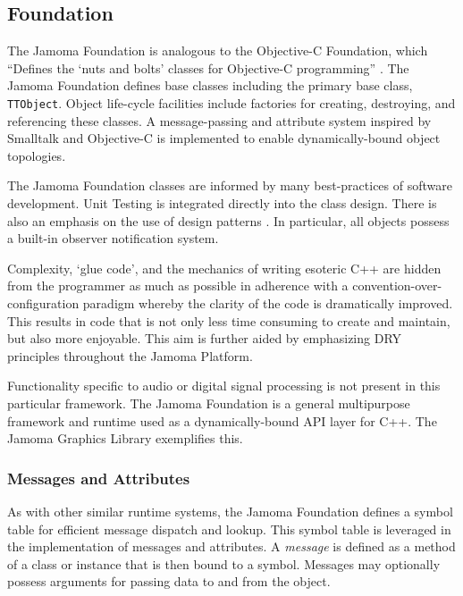 \documentclass[twoside,10pt]{article}
\begin{document}
\subsection{Foundation} %

The Jamoma Foundation \cite{web7} is analogous to the Objective-C Foundation, which ``Defines the `nuts and bolts' classes for Objective-C programming'' \cite{web8}.  The Jamoma Foundation defines base classes including the primary base class, \texttt{\small{TTObject}}.  Object life-cycle facilities include factories for creating, destroying, and referencing these classes.  A message-passing and attribute system inspired by Smalltalk and Objective-C is implemented to enable dynamically-bound object topologies.  

The Jamoma Foundation classes are informed by many best-practices of software development.  Unit Testing is integrated directly into the class design.  There is also an emphasis on the use of design patterns \cite{Gamma:1995}.  In particular, all objects possess a built-in observer notification system.  

Complexity, `glue code', and the mechanics of writing esoteric C++ are hidden from the programmer as much as possible in adherence with a convention-over-configuration paradigm whereby the clarity of the code is dramatically improved.  This results in code that is not only less time consuming to create and maintain, but also more enjoyable.  This aim is further aided by emphasizing DRY principles throughout the Jamoma Platform.

Functionality specific to audio or digital signal processing is not present in this particular framework.  The Jamoma Foundation is a general multipurpose framework and runtime used as a dynamically-bound API layer for C++.  The Jamoma Graphics Library exemplifies this.

\subsubsection{Messages and Attributes} %

As with other similar runtime systems, the Jamoma Foundation defines a symbol table for efficient message dispatch and lookup.  This symbol table is leveraged in the implementation of messages and attributes.  
A \emph{message} is defined as a method of a class or instance that is then bound to a symbol.  Messages may optionally possess arguments for passing data to and from the object.
\end{document}
